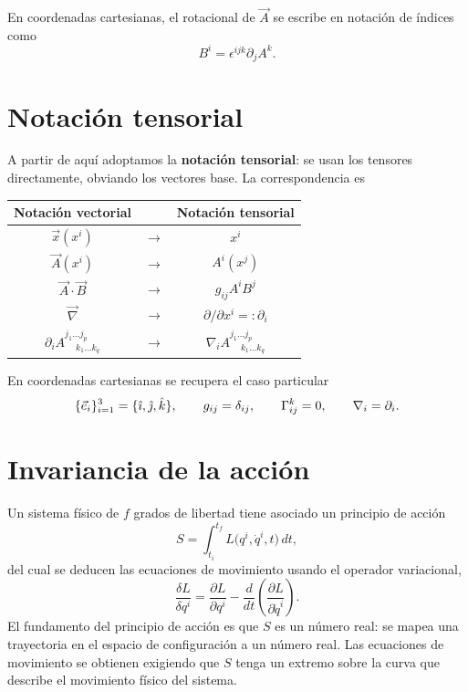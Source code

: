 \begin{proposicionc}
En coordenadas cartesianas, el rotacional de $\vec A$ se escribe en
notación de índices como
\[
B^i = \epsilon^{ijk}\partial_jA^k .
\]
\end{proposicionc}

\section{Notación tensorial}

A partir de aquí adoptamos la \textbf{notación tensorial}: se usan los
tensores directamente, obviando los vectores base. La correspondencia es

\begin{center}
\begin{tabular}{ccc}
Notación vectorial & & Notación tensorial \\ \hline
$\vec x(x^i)$ & $\longrightarrow$ & $x^i$ \\
$\vec A(x^i)$ & $\longrightarrow$ & $A^i(x^j)$ \\
$\vec A\cdot\vec B$ & $\longrightarrow$ & $g_{ij}A^iB^j$ \\
$\vec\nabla$ & $\longrightarrow$ & $\partial/\partial x^i =: \partial_i$
\\
$\partial_iA^{j_1\dots j_p}_{\quad\ k_1\dots k_q}$ & $\longrightarrow$ &
$\nabla_iA^{j_1\dots j_p}_{\quad\ k_1\dots k_q}$
\end{tabular}
\end{center}

\begin{observacion}
En coordenadas cartesianas se recupera el caso particular
\[
\{\vec e_i\}_{i=1}^3 = \{\hat{\imath},\hat{\jmath},\hat{k}\}, \qquad g_{ij}=\delta_{ij},
\qquad \Gamma^k_{ij}=0, \qquad \nabla_i = \partial_i .
\]
\end{observacion}

\section{Invariancia de la acción}

Un sistema físico de $f$ grados de libertad tiene asociado un principio
de acción
\[
S = \int_{t_i}^{t_f} L\big(q^i,\dot q^i,t\big)\, dt ,
\]
del cual se deducen las ecuaciones de movimiento usando el operador
variacional,
\[
\frac{\delta L}{\delta q^i} = \frac{\partial L}{\partial q^i} -
\frac{d}{dt}\left(\frac{\partial L}{\partial \dot q^i}\right).
\]
El fundamento del principio de acción es que $S$ es un número real: se
mapea una trayectoria en el espacio de configuración a un número real.
Las ecuaciones de movimiento se obtienen exigiendo que $S$ tenga un
extremo sobre la curva que describe el movimiento físico del sistema.

